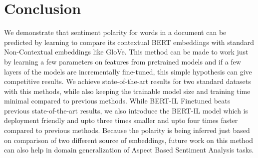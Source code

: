 \documentclass[11pt,a4paper]{article}
\begin{document}
\section{Conclusion}

We demonstrate that sentiment polarity for words in a document can be predicted by learning to compare its contextual BERT embeddings with standard Non-Contextual embeddings like GloVe. This method can be made to work just by learning a few parameters on features from pretrained models and if a few layers of the models are incrementally fine-tuned, this simple hypothesis can give competitive results. We achieve state-of-the-art results for two standard datasets with this methods, while also keeping the trainable model size and training time minimal compared to previous methods. While BERT-IL Finetuned beats previous state-of-the-art results, we also introduce the BERT-IL model which is deployment friendly and upto three times smaller and upto four times faster compared to previous methods. Because the polarity is being inferred just based on comparison of two different source of embeddings, future work on this method can also help in domain generalization of Aspect Based Sentiment Analysis tasks.







\end{document}
